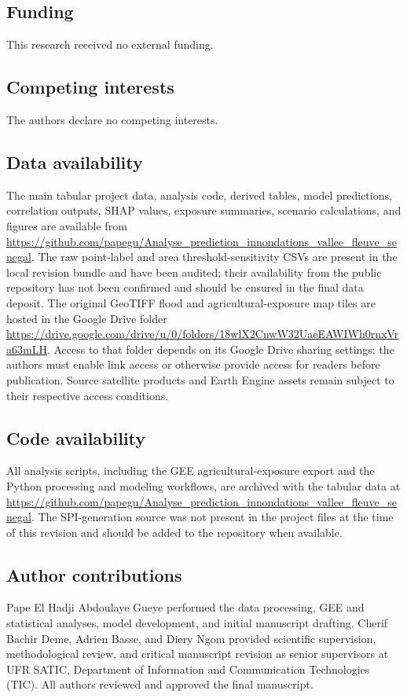 \documentclass[pdflatex,sn-mathphys,Numbered]{sn-jnl}
\begin{document}
\subsection*{Funding}
This research received no external funding.

\subsection*{Competing interests}
The authors declare no competing interests.

\subsection*{Data availability}
The main tabular project data, analysis code, derived tables, model predictions, correlation outputs, SHAP values, exposure summaries, scenario calculations, and figures are available from \url{https://github.com/papegu/Analyse_prediction_innondations_vallee_fleuve_senegal}. The raw point-label and area threshold-sensitivity CSVs are present in the local revision bundle and have been audited; their availability from the public repository has not been confirmed and should be ensured in the final data deposit. The original GeoTIFF flood and agricultural-exposure map tiles are hosted in the Google Drive folder \url{https://drive.google.com/drive/u/0/folders/18wlX2CnwW32UaeEAWIWh0rnxVra63mLH}. Access to that folder depends on its Google Drive sharing settings; the authors must enable link access or otherwise provide access for readers before publication. Source satellite products and Earth Engine assets remain subject to their respective access conditions.

\subsection*{Code availability}
All analysis scripts, including the GEE agricultural-exposure export and the Python processing and modeling workflows, are archived with the tabular data at \url{https://github.com/papegu/Analyse_prediction_innondations_vallee_fleuve_senegal}. The SPI-generation source was not present in the project files at the time of this revision and should be added to the repository when available.

\subsection*{Author contributions}
Pape El Hadji Abdoulaye Gueye performed the data processing, GEE and statistical analyses, model development, and initial manuscript drafting. Cherif Bachir Deme, Adrien Basse, and Diery Ngom provided scientific supervision, methodological review, and critical manuscript revision as senior supervisors at UFR SATIC, Department of Information and Communication Technologies (TIC). All authors reviewed and approved the final manuscript.


\end{document}
